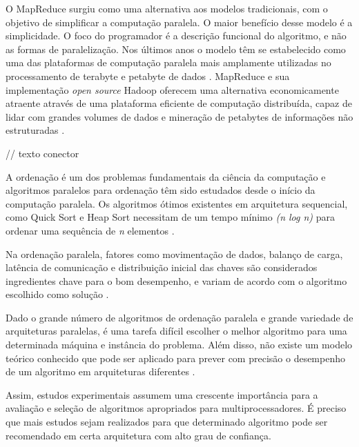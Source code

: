 
O MapReduce surgiu como uma alternativa aos modelos tradicionais, com o objetivo de simplificar a computação paralela. O maior benefício desse modelo é a simplicidade. O foco do programador é a descrição funcional do algoritmo, e não as formas de paralelização. Nos últimos anos o modelo têm se estabelecido como uma das plataformas de computação paralela mais amplamente utilizadas no processamento de terabyte e petabyte de dados \cite{Ranger:2007}.
MapReduce e sua implementação \textit{open source} Hadoop oferecem  uma alternativa economicamente atraente através de uma plataforma eficiente de computação distribuída, capaz de lidar com grandes volumes de dados e mineração de petabytes de informações não estruturadas \cite{Cherkasova:2011}.

// texto conector


A ordenação é um dos problemas fundamentais da ciência da computação e algoritmos paralelos para ordenação têm sido estudados desde o início da computação paralela.
Os algoritmos ótimos existentes em arquitetura sequencial, como Quick Sort e Heap Sort necessitam de um tempo mínimo \textit{(n log n)} para ordenar uma sequência de \textit{n} elementos \cite{Aho:1974}.


Na ordenação paralela, fatores como movimentação de dados, balanço de carga, latência de comunicação e distribuição inicial das chaves são considerados ingredientes chave para o bom desempenho, e variam de acordo com o algoritmo escolhido como solução \cite{Kale:2010}. 

Dado o grande número de algoritmos de ordenação paralela e grande variedade de arquiteturas paralelas, é uma tarefa difícil escolher o melhor algoritmo para uma determinada máquina e instância do problema. Além disso, não existe um modelo teórico conhecido que pode ser aplicado para prever com precisão o desempenho de um algoritmo em arquiteturas diferentes \cite{Amato:1996}.

Assim, estudos experimentais assumem uma crescente importância para a avaliação e seleção de algoritmos apropriados para multiprocessadores. É preciso que mais estudos sejam realizados para que determinado algoritmo pode ser recomendado em certa arquitetura com alto grau de confiança.

